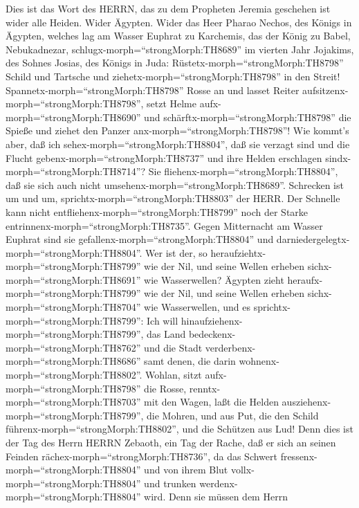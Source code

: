  Dies ist das Wort des HERRN, das zu dem Propheten Jeremia
geschehen ist wider alle Heiden.  Wider Ägypten. Wider das
Heer Pharao Nechos, des Königs in Ägypten, welches lag am Wasser Euphrat
zu Karchemis, das der König zu Babel, Nebukadnezar,
schlugx-morph=``strongMorph:TH8689'' im vierten Jahr Jojakims, des
Sohnes Josias, des Königs in Juda: 
Rüstetx-morph=``strongMorph:TH8798'' Schild und Tartsche und
ziehetx-morph=``strongMorph:TH8798'' in den Streit! 
Spannetx-morph=``strongMorph:TH8798'' Rosse an und lasset Reiter
aufsitzenx-morph=``strongMorph:TH8798'', setzt Helme
aufx-morph=``strongMorph:TH8690'' und
schärftx-morph=``strongMorph:TH8798'' die Spieße und ziehet den Panzer
anx-morph=``strongMorph:TH8798''!  Wie kommt's aber, daß ich
sehex-morph=``strongMorph:TH8804'', daß sie verzagt sind und die Flucht
gebenx-morph=``strongMorph:TH8737'' und ihre Helden erschlagen
sindx-morph=``strongMorph:TH8714''? Sie
fliehenx-morph=``strongMorph:TH8804'', daß sie sich auch nicht
umsehenx-morph=``strongMorph:TH8689''. Schrecken ist um und um,
sprichtx-morph=``strongMorph:TH8803'' der HERR.  Der
Schnelle kann nicht entfliehenx-morph=``strongMorph:TH8799'' noch der
Starke entrinnenx-morph=``strongMorph:TH8735''. Gegen Mitternacht am
Wasser Euphrat sind sie gefallenx-morph=``strongMorph:TH8804'' und
darniedergelegtx-morph=``strongMorph:TH8804''.  Wer ist der,
so heraufziehtx-morph=``strongMorph:TH8799'' wie der Nil, und seine
Wellen erheben sichx-morph=``strongMorph:TH8691'' wie Wasserwellen?
 Ägypten zieht heraufx-morph=``strongMorph:TH8799'' wie der
Nil, und seine Wellen erheben sichx-morph=``strongMorph:TH8704'' wie
Wasserwellen, und es sprichtx-morph=``strongMorph:TH8799'': Ich will
hinaufziehenx-morph=``strongMorph:TH8799'', das Land
bedeckenx-morph=``strongMorph:TH8762'' und die Stadt
verderbenx-morph=``strongMorph:TH8686'' samt denen, die darin
wohnenx-morph=``strongMorph:TH8802''.  Wohlan, sitzt
aufx-morph=``strongMorph:TH8798'' die Rosse,
renntx-morph=``strongMorph:TH8703'' mit den Wagen, laßt die Helden
ausziehenx-morph=``strongMorph:TH8799'', die Mohren, und aus Put, die
den Schild führenx-morph=``strongMorph:TH8802'', und die Schützen aus
Lud!  Denn dies ist der Tag des Herrn HERRN Zebaoth, ein
Tag der Rache, daß er sich an seinen Feinden
rächex-morph=``strongMorph:TH8736'', da das Schwert
fressenx-morph=``strongMorph:TH8804'' und von ihrem Blut
vollx-morph=``strongMorph:TH8804'' und trunken
werdenx-morph=``strongMorph:TH8804'' wird. Denn sie müssen dem Herrn
